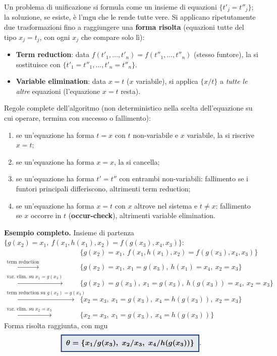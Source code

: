 \documentclass[a4paper,11pt]{article}
\newcommand{\keyeq}[1]{{\setlength{\fboxsep}{6pt}\setlength{\fboxrule}{1.3pt}\fcolorbox{iablue}{iablue!12}{\boldmath$\displaystyle #1$}}}
\begin{document}
Un problema di unificazione si formula come un insieme di equazioni $\{t'_j=t''_j\}$; la soluzione, se esiste, è l'mgu che le rende tutte vere. Si applicano ripetutamente due trasformazioni fino a raggiungere una \textbf{forma risolta} (equazioni tutte del tipo $x_j=t_j$, con ogni $x_j$ che compare solo lì):
\begin{itemize}
  \item \textbf{Term reduction}: data $f(t'_1,\ldots,t'_n)=f(t''_1,\ldots,t''_n)$ (stesso funtore), la si sostituisce con $\{t'_1=t''_1,\ldots,t'_n=t''_n\}$.
  \item \textbf{Variable elimination}: data $x=t$ ($x$ variabile), si applica $\{x/t\}$ a \emph{tutte le altre} equazioni (l'equazione $x=t$ resta).
\end{itemize}
Regole complete dell'algoritmo (non deterministico nella scelta dell'equazione su cui operare, termina con successo o fallimento):
\begin{enumerate}[label=(\alph*)]
  \item se un'equazione ha forma $t=x$ con $t$ non-variabile e $x$ variabile, la si riscrive $x=t$;
  \item se un'equazione ha forma $x=x$, la si cancella;
  \item se un'equazione ha forma $t'=t''$ con entrambi non-variabili: fallimento se i funtori principali differiscono, altrimenti term reduction;
  \item se un'equazione ha forma $x=t$ con $x$ altrove nel sistema e $t\neq x$: fallimento se $x$ occorre in $t$ (\textbf{occur-check}), altrimenti variable elimination.
\end{enumerate}

\textbf{Esempio completo.} Insieme di partenza $\{g(x_2)=x_1,\ f(x_1,h(x_1),x_2)=f(g(x_3),x_4,x_3)\}$:
\begin{align*}
&\{g(x_2)=x_1,\ f(x_1,h(x_1),x_2)=f(g(x_3),x_4,x_3)\}\\
\xrightarrow{\text{term reduction}}\quad&\{g(x_2)=x_1,\ x_1=g(x_3),\ h(x_1)=x_4,\ x_2=x_3\}\\
\xrightarrow{\text{var.\ elim.\ su }x_1=g(x_3)}\quad&\{g(x_2)=g(x_3),\ x_1=g(x_3),\ h(g(x_3))=x_4,\ x_2=x_3\}\\
\xrightarrow{\text{term reduction su }g(x_2)=g(x_3)}\quad&\{x_2=x_3,\ x_1=g(x_3),\ x_4=h(g(x_3)),\ x_2=x_3\}\\
\xrightarrow{\text{var.\ elim.\ su }x_2=x_3}\quad&\{x_2=x_3,\ x_1=g(x_3),\ x_4=h(g(x_3))\}
\end{align*}
Forma risolta raggiunta, con mgu
\[
\keyeq{\theta = \{x_1/g(x_3),\ x_2/x_3,\ x_4/h(g(x_3))\}}.
\]
\end{document}

